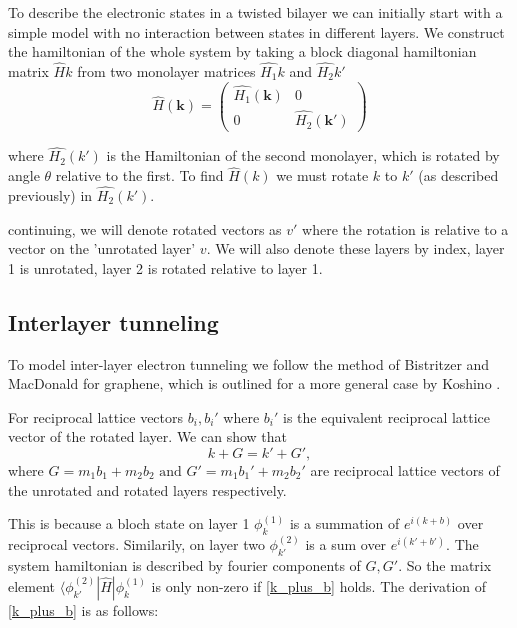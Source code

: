 \documentclass[12pt]{report} %
\begin{document}
  To describe the electronic states in a twisted bilayer we can initially start with a simple model with no interaction between states in different layers. We construct the hamiltonian of the whole system by taking a block diagonal hamiltonian matrix $\hat{H}{k}$ from two monolayer matrices $\hat{H_1}{k}$ and $\hat{H_2}{k'}$
%
      \begin{equation}
        \hat{H}(\boldsymbol{k})=\left(\begin{array}{cc}
          \hat{H_1}(\boldsymbol{k}) & 0\\
          0 & \hat{H_2}(\boldsymbol{k'})
        \end{array}\right)
      \end{equation}
      
  where $\hat{H_2}(k')$ is the Hamiltonian of the second monolayer, which is rotated by angle $\theta$ relative to the first. To find $\hat{H}(k)$ we must rotate $k$ to $k'$ (as described previously) in $\hat{H_2}(k')$.

  continuing, we will denote rotated vectors as $v'$ where the rotation is relative to a vector on the 'unrotated layer' $v$. We will also denote these layers by index, layer 1 is unrotated, layer 2 is rotated relative to layer 1.

\subsection*{Interlayer tunneling}
  To model inter-layer electron tunneling we follow the method of Bistritzer and MacDonald \cite{Bistritzer2011} for graphene, which is outlined for a more general case by Koshino \cite{Koshino2015}.

  For reciprocal lattice vectors $b_i, b_i'$ where $b_i'$ is the equivalent reciprocal lattice vector of the rotated layer. We can show that
  \begin{equation}
    k + G = k' + G',
    \label{inter-layer_k_plus_G}
  \end{equation}
  where $G = m_1 b_1 + m_2 b_2 \text{ and } G' = m_1 b_1' + m_2 b_2'$ are reciprocal lattice vectors of the unrotated and rotated layers respectively.

  This is because a bloch state on layer 1 $\phi_k^{(1)}$ is a summation of $e^{i(k+b)}$ over reciprocal vectors. Similarily, on layer two $\phi_{k'}^{(2)}$ is a sum over $e^{i(k'+b')}$. The system hamiltonian is described by fourier components of $G, G'$. So the matrix element $\langle \phi_{k'}^{(2)} | \hat{H} | \phi_{k}^{(1)}$ is only non-zero if \ref{k_plus_b} holds. The derivation of \ref{k_plus_b} is as follows:
\end{document}
